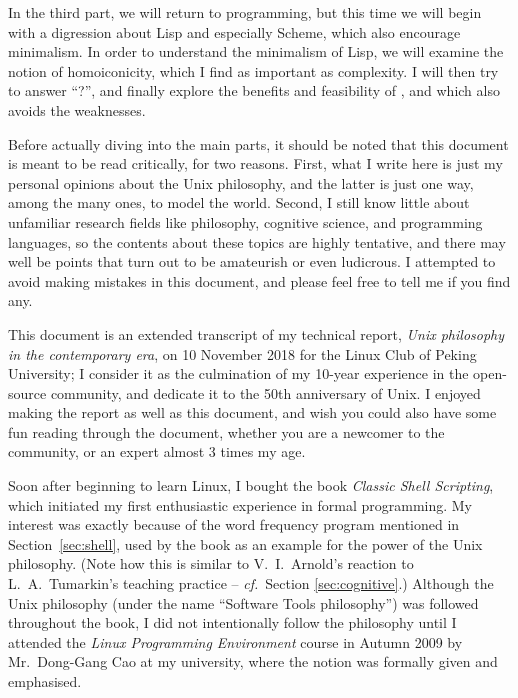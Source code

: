 \documentclass{article}
\newcommand*{\cf}{\emph{cf.}}
\begin{document}
In the third part, we will return to programming, but this time we will begin
with a digression about Lisp and especially Scheme, which also encourage
minimalism.  In order to understand the minimalism of Lisp, we will examine
the notion of homoiconicity, which I find as important as complexity.  I will
then try to answer ``?'', and finally explore the benefits and feasibility of
, and which also avoids the weaknesses.

Before actually diving into the main parts, it should be noted that this
document is meant to be read critically, for two reasons.  First, what I write
here is just my personal opinions about the Unix philosophy, and the latter
is just one way, among the many ones, to model the world.  Second, I still
know little about unfamiliar research fields like philosophy, cognitive
science, and programming languages, so the contents about these topics are
highly tentative, and there may well be points that turn out to be amateurish
or even ludicrous.  I attempted to avoid making mistakes in this document,
and please feel free to tell me if you find any.

This document is an extended transcript of my technical report,
\emph{Unix philosophy in the contemporary era}, on
10 November 2018 for the Linux Club of Peking University; I consider it
as the culmination of my 10-year experience in the open-source community,
and dedicate it to the 50th anniversary of Unix.
I enjoyed making the report as well as this document, and wish you
could also have some fun reading through the document, whether you
are a newcomer to the community, or an expert almost 3 times my age.





\newpart
\begingroup
\setlength{\hfuzz}{7.5pt}
\printbibliography[heading = bibintoc, title = References]
\endgroup
\newpart
{}\label{sec:afterword}

Soon after beginning to learn Linux, I bought the book \emph{Classic Shell
Scripting}, which initiated my first enthusiastic experience in formal
programming.  My interest was exactly because of the word frequency program
mentioned in Section~\ref{sec:shell}, used by the book as an example for the
power of the Unix philosophy.  (Note how this is similar to V.\ I.\ Arnold's
reaction to L.\ A.\ Tumarkin's teaching practice -- \cf~Section
\ref{sec:cognitive}.)  Although the Unix philosophy (under the name
``Software Tools philosophy'') was followed throughout the book, I did
not intentionally follow the philosophy until I attended the \emph{Linux
Programming Environment} course in Autumn 2009 by Mr.\ Dong-Gang Cao
at my university, where the notion was formally given and emphasised.
\end{document}
